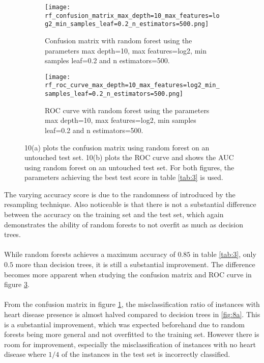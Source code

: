\documentclass[a4paper,twocolumn]{article}
\begin{document}
\begin{figure}[ht!]
    \centering
    \begin{subfigure}[b]{\columnwidth}
        \texttt{[image: rf\_confusion\_matrix\_max\_depth=10\_max\_features=log2\_min\_samples\_leaf=0.2\_n\_estimators=500.png]}
        \caption{Confusion matrix with random forest using the parameters max depth=10, max features=log2, min samples leaf=0.2 and n estimators=500.}
        \label{fig:10a}
    \end{subfigure}
    
    \begin{subfigure}[b]{\columnwidth}
        \texttt{[image: rf\_roc\_curve\_max\_depth=10\_max\_features=log2\_min\_samples\_leaf=0.2\_n\_estimators=500.png]}
        \caption{ROC curve with random forest using the parameters max depth=10, max features=log2, min samples leaf=0.2 and n estimators=500.}
        \label{fig:10b}
    \end{subfigure}
    \caption{10(a) plots the confusion matrix using random forest on an untouched test set. 10(b) plots the ROC curve and shows the AUC using random forest on an untouched test set. For both figures, the parameters achieving the best test score in table \ref{tab:3} is used.}
    \label{fig:10}
\end{figure}
The varying accuracy score is due to the randomness of introduced by the resampling technique. Also noticeable is that there is not a substantial difference between the accuracy on the training set and the test set, which again demonstrates the ability of random forests to not overfit as much as decision trees.
\\
\\
While random forests achieves a maximum accuracy of $0.85$ in table \ref{tab:3}, only $0.5$ more than decision trees, it is still a  substantial improvement. The difference becomes more apparent when studying the confusion matrix and ROC curve in figure \ref{fig:10}.\\
\\
From the confusion matrix in figure \ref{fig:10a}, the misclassification ratio of instances with heart disease presence is almost halved compared to decision trees in \ref{fig:8a}. This is a substantial improvement, which was expected beforehand due to random forests being more general and not overfitted to the training set. However there is room for improvement, especially the misclassification of instances with no heart disease where $1/4$ of the instances in the test set is incorrectly classified. \\
\end{document}

